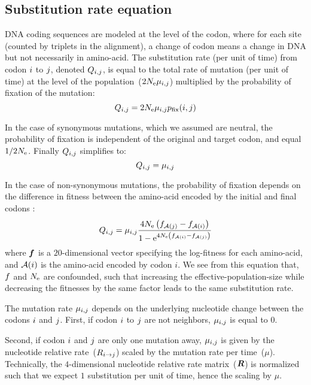 \subsection{Substitution rate equation}
\label{sec:MutSelEq}
DNA coding sequences are modeled at the level of the \gls{codon}, where for each site (counted by triplets in the alignment), a change of \gls{codon} means a change in \acrshort{DNA} but not necessarily in amino-acid.
The \gls{substitution} rate (per unit of time) from \gls{codon} ${i}$ to ${j}$, denoted $Q_{{i}, {j}}$, is equal to the total rate of mutation (per unit of time) at the level of the population~($2N_{\mathrm{e}}\mu_{{i}, {j}}$) multiplied by the probability of fixation of the mutation:
\begin{equation}
{Q_{{i}, {j}}} = 2 N_{\mathrm{e}} \mu_{{i}, {j}} p_{\mathrm{fix}}({i}, {j})
\end{equation}

In the case of synonymous mutations, which we assumed are \gls{neutral}, the probability of fixation is independent of the original and target \gls{codon}, and equal $1/2 N_{\mathrm{e}}$.
Finally ${Q_{{i}, {j}}}$ simplifies to: 
\begin{equation}
Q_{{i}, {j}} = \mu_{{i}, {j}}
\end{equation}

In the case of non-synonymous mutations, the probability of fixation depends on the difference in fitness between the amino-acid encoded by the initial and final \glspl{codon} \citep{Ohta1992}:
\begin{equation}
\label{eq:mutationSelection}
{\submatrix_{\itoj}} = \mu_{\itoj} \dfrac{4 \Ne \left({\fitj - \fiti}\right)}{{1 - \e^{4 \Ne \left({\fiti - \fitj}\right)} }}
\end{equation}
where $\bm{f}$ is a $20$-dimensional vector specifying the log-fitness for each amino-acid, and $\mathcal{A}({i})$ is the amino-acid encoded by \gls{codon} $i$.
We see from this equation that, $f$ and $N_{\mathrm{e}}$ are confounded, such that increasing the \gls{effective-population-size} while decreasing the fitnesses by the same factor leads to the same \gls{substitution} rate.

The mutation rate $\mu_{{i}, {j}}$ depends on the underlying nucleotide change between the \glspl{codon} ${i}$ and ${j}$.
First, if \gls{codon} ${i}$ to ${j}$ are not neighbors, $\mu_{{i}, {j}}$ is equal to $0$.

Second, if \gls{codon} ${i}$ and ${j}$ are only one mutation away, $\mu_{{i}, {j}}$ is given by the nucleotide relative rate~(${R_{{i} \rightarrow {j}}}$) scaled by the mutation rate per time~($\mu$).
Technically, the $4$-dimensional nucleotide relative rate matrix~($\bm{R}$) is normalized such that we expect $1$ \gls{substitution} per unit of time, hence the scaling by $\mu$.

